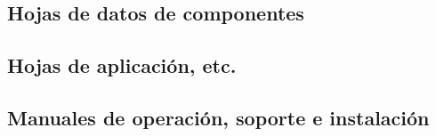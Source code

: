   \newpage




  \subsection{Hojas de datos de componentes}  

  \newpage




  \subsection{Hojas de aplicación, etc.}  

  \newpage




  \subsection{Manuales de operación, soporte e instalación}  

  \newpage

